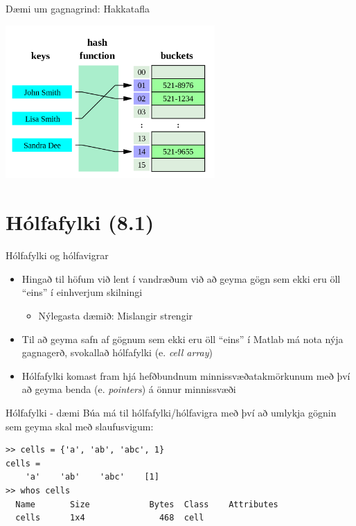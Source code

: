 \documentclass{beamer}
\begin{document}
\begin{frame}{Dæmi um gagnagrind: Hakkatafla}
\begin{center}
\includegraphics[width=0.6\textwidth]{Pics/hash-table}
\end{center}
\end{frame}

\section{Hólfafylki (8.1)}

\begin{frame}{Hólfafylki og hólfavigrar}
\begin{itemize}
 \item Hingað til höfum við lent í vandræðum við að geyma gögn sem ekki eru öll ``eins'' í einhverjum skilningi
 \begin{itemize}
  \item Nýlegasta dæmið: Mislangir strengir
 \end{itemize}
 \item Til að geyma safn af gögnum sem ekki eru öll ``eins'' í Matlab má nota nýja gagnagerð, svokallað hólfafylki (e. \emph{cell array})
 \item Hólfafylki komast fram hjá hefðbundnum minnissvæðatakmörkunum með því að geyma benda (e. \emph{pointers}) á önnur minnissvæði
\end{itemize}
\end{frame}

\begin{frame}[fragile]{Hólfafylki - dæmi}
Búa má til hólfafylki/hólfavigra með því að umlykja gögnin sem geyma skal með slaufusvigum:

\begin{verbatim}
>> cells = {'a', 'ab', 'abc', 1}
cells = 
    'a'    'ab'    'abc'    [1]
>> whos cells
  Name       Size            Bytes  Class    Attributes
  cells      1x4               468  cell
\end{verbatim}
\end{frame}
\end{document}
